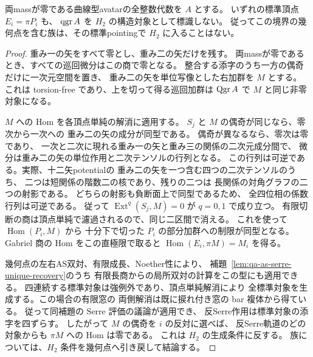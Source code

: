 \begin{corollary}[両mass零の幾何点における全標準pointingの障害]
\label{cor:qa-avatar-deep-pointing-obstruction}
両massが零である曲線型avatarの全整数代数を $A$ とする。
いずれの標準頂点 $E_i=\pi P_i$ も、
$\operatorname{qgr} A$ を $H_2$ の構造対象として標識しない。
従ってこの境界の幾何点を含む族は、その標準pointingで
$H_2$ に入ることはない。
\end{corollary}
\begin{proof}
重み一の矢をすべて零とし、重み二の矢だけを残す。
両massが零であるとき、すべての巡回微分はこの商で零となる。
整合する添字のうち一方の偶奇だけに一次元空間を置き、
重み二の矢を単位写像とした右加群を $M$ とする。
これは torsion-free であり、上を切って得る巡回加群は
$\operatorname{Qgr} A$ で $M$ と同じ非零対象になる。

$M$ への Hom を各頂点単純の解消に適用する。
$S_j$ と $M$ の偶奇が同じなら、零次から一次への
重み二の矢の成分が同型である。
偶奇が異なるなら、零次は零であり、
一次と二次に現れる重み一の矢と重み三の関係の二次元成分間で、
微分は重み二の矢の単位作用と二次テンソルの行列となる。
この行列は可逆である。実際、十二矢potentialの
重み二の矢を一つ含む四つの二次テンソルのうち、
二つは短関係の階数二の核であり、残りの二つは
長関係の対角グラフの二つの射影である。
どちらの射影も負断面上で同型であるため、
全四位相の係数行列は可逆である。
従って $\operatorname{Ext}^q(S_j,M)=0$ が $q=0,1$ で成り立つ。
有限切断の商は頂点単純で濾過されるので、同じ二区間で消える。
これを使って $\operatorname{Hom}(P_i,M)$ から
十分下で切った $P_i$ の部分加群への制限が同型となる。
Gabriel 商の Hom をこの直極限で取ると
$\operatorname{Hom}(E_i,\pi M)=M_i$ を得る。

幾何点の左右AS双対、有限成長、Noether性により、
補題~\ref{lem:qa-as-serre-unique-recovery}のうち
有限長商からの局所双対の計算をこの型にも適用できる。
四連続する標準対象は強例外であり、頂点単純解消により
全標準対象を生成する。この場合の有限窓の
両側解消は既に捩れ付き窓の bar 複体から得ている。
従って同補題の Serre 評価の議論が適用でき、
反Serre作用は標準対象の添字を四ずらす。
したがって $M$ の偶奇を $i$ の反対に選べば、
反Serre軌道のどの対象からも $\pi M$ への Hom は零である。
これは $H_2$ の生成条件に反する。
族については、$H_2$ 条件を幾何点へ引き戻して結論する。
\end{proof}


